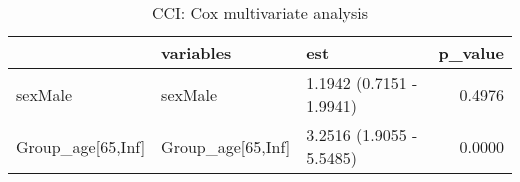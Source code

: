 \begin{table}

\caption{CCI: Cox multivariate analysis}
\centering
\begin{tabular}[t]{l|l|l|r}
\hline
  & variables & est & p\_value\\
\hline
sexMale & sexMale & 1.1942 (0.7151 - 1.9941) & 0.4976\\
\hline
Group\_age[65,Inf] & Group\_age[65,Inf] & 3.2516 (1.9055 - 5.5485) & 0.0000\\
\hline
\end{tabular}
\end{table}
